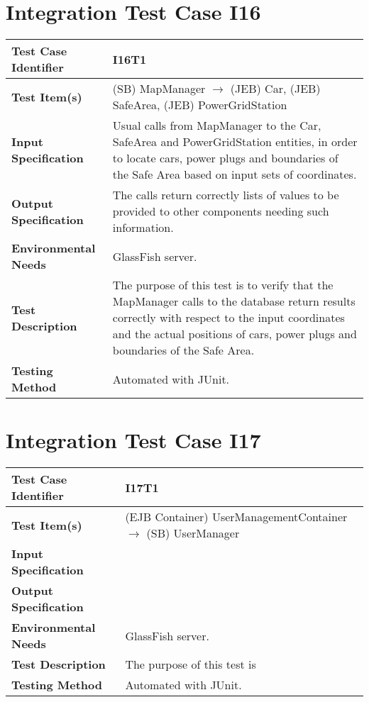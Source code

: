 \section{Integration Test Case I16}

\begin{longtable}{p{} | p{}}
\hline
\textbf{Test Case Identifier} & I16T1\\
\hline
\textbf{Test Item(s)} & (SB) MapManager $\rightarrow$ (JEB) Car, (JEB) SafeArea, (JEB) PowerGridStation \\
\hline
\textbf{Input Specification} & Usual calls from MapManager to the Car, SafeArea and PowerGridStation entities, in order to locate cars, power plugs and boundaries of the Safe Area based on input sets of coordinates. \\
\hline
\textbf{Output Specification} & The calls return correctly lists of values to be provided to other components needing such information. \\
\hline
\textbf{Environmental Needs} & GlassFish server. \\
\hline
\textbf{Test Description} & The purpose of this test is to verify that the MapManager calls to the database return results correctly with respect to the input coordinates and the actual positions of cars, power plugs and boundaries of the Safe Area. \\
\hline
\textbf{Testing Method} & Automated with JUnit. \\
\hline
\end{longtable}

\section{Integration Test Case I17}

\begin{longtable}{p{} | p{}}
\hline
\textbf{Test Case Identifier} & I17T1\\
\hline
\textbf{Test Item(s)} & (EJB Container) UserManagementContainer $\rightarrow$ (SB) UserManager \\
\hline
\textbf{Input Specification} &  \\
\hline
\textbf{Output Specification} &  \\
\hline
\textbf{Environmental Needs} & GlassFish server. \\
\hline
\textbf{Test Description} & The purpose of this test is  \\
\hline
\textbf{Testing Method} & Automated with JUnit. \\
\hline
\end{longtable}

